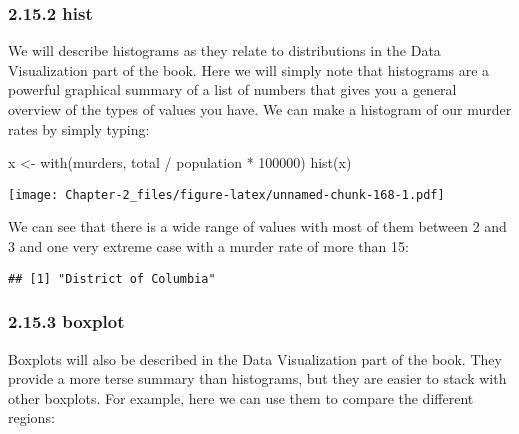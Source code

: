 \documentclass[
]{article}
\newenvironment{Shaded}{\begin{snugshade}}{\end{snugshade}}
\newcommand{\AttributeTok}[1]{\textcolor[rgb]{0.77,0.63,0.00}{#1}}
\newcommand{\DecValTok}[1]{\textcolor[rgb]{0.00,0.00,0.81}{#1}}
\newcommand{\FunctionTok}[1]{\textcolor[rgb]{0.00,0.00,0.00}{#1}}
\newcommand{\NormalTok}[1]{#1}
\newcommand{\OtherTok}[1]{\textcolor[rgb]{0.56,0.35,0.01}{#1}}
\newcommand{\SpecialCharTok}[1]{\textcolor[rgb]{0.00,0.00,0.00}{#1}}
\begin{document}
\hypertarget{hist}{%
\subsubsection{2.15.2 hist}\label{hist}}

We will describe histograms as they relate to distributions in the Data
Visualization part of the book. Here we will simply note that histograms
are a powerful graphical summary of a list of numbers that gives you a
general overview of the types of values you have. We can make a
histogram of our murder rates by simply typing:

\begin{Shaded}
\begin{Highlighting}[]
\NormalTok{x }\OtherTok{\textless{}{-}} \FunctionTok{with}\NormalTok{(murders, total }\SpecialCharTok{/}\NormalTok{ population }\SpecialCharTok{*} \DecValTok{100000}\NormalTok{)}
\FunctionTok{hist}\NormalTok{(x)}
\end{Highlighting}
\end{Shaded}

\texttt{[image: Chapter-2\_files/figure-latex/unnamed-chunk-168-1.pdf]}

We can see that there is a wide range of values with most of them
between 2 and 3 and one very extreme case with a murder rate of more
than 15:

\begin{Shaded}
\end{Shaded}

\begin{verbatim}
## [1] "District of Columbia"
\end{verbatim}

\hypertarget{boxplot}{%
\subsubsection{2.15.3 boxplot}\label{boxplot}}

Boxplots will also be described in the Data Visualization part of the
book. They provide a more terse summary than histograms, but they are
easier to stack with other boxplots. For example, here we can use them
to compare the different regions:

\begin{Shaded}
\end{Shaded}
\end{document}
